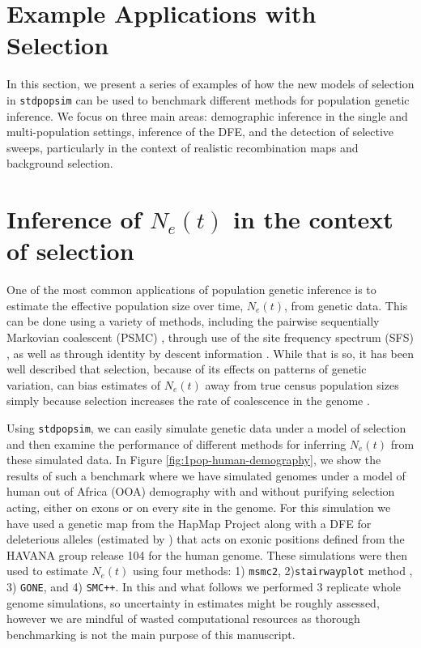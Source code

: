 \documentclass[hidelinks]{article}
\newcommand{\stdpopsim}{\texttt{stdpopsim}\xspace}
\newcommand{\msmc}{\texttt{msmc2}\xspace}
\newcommand{\stairway}{\texttt{stairwayplot}\xspace}
\newcommand{\gone}{\texttt{GONE}\xspace}
\newcommand{\smcpp}{\texttt{SMC++}\xspace}
\begin{document}
    
\section*{Example Applications with Selection}
    \label{applications}
    In this section, we present a series of examples of how the new models of selection
    in \stdpopsim can be used to benchmark different
    methods for population genetic inference.
    We focus on three main areas: demographic inference in the 
    single and multi-population settings, inference of the DFE,
    and the detection of selective sweeps, particularly in the context of realistic recombination maps and background selection.

    \section*{Inference of $N_e(t)$ in the context of selection}
    One of the most common applications of population genetic inference is to estimate
    the effective population size over time, $N_e(t)$, from genetic data. This can be done
    using a variety of methods, including the pairwise sequentially Markovian coalescent
    (PSMC) \citep{li2011inference}, through use of the site frequency spectrum (SFS) \citep{liu2020stairway},
    as well as through identity by descent information \citep{santiago2020recent}. 
    While that is so, it has been well described that selection, because of its effects on
    patterns of genetic variation, can bias estimates of $N_e(t)$
    away from true census population sizes simply because selection increases the 
    rate of coalescence in the genome \citep[e.g.][]{schrider2016effects}. 

    Using \stdpopsim, we can easily simulate genetic data under a model of selection and then 
    examine the performance of different methods for inferring $N_e(t)$ from these simulated 
    data. In Figure \ref{fig:1pop-human-demography}, we show the results of such a benchmark
    where we have simulated genomes under a model of human out of Africa (OOA) demography
    with and without purifying selection acting, either on exons or on every site in the genome.
    For this simulation we have used
    a genetic map from the HapMap Project \citep{international2007second} along with a
    DFE for deleterious alleles (estimated by \cite{huber2017determining})
    that acts on exonic positions defined from the HAVANA group release 104 for the human genome.
    These simulations were then used to estimate $N_e(t)$ using four methods: 1) \msmc \citep{Schiffels2020}, 
    2)\stairway method \citep{liu2020stairway}, 3) \gone \citep{santiago2020recent}, and 4) \smcpp \citep{terhorst2017robust}.
    In this and what follows we performed 3 replicate whole genome simulations, so uncertainty in estimates might
    be roughly assessed, however we are mindful of wasted computational resources as thorough benchmarking
    is not the main purpose of this manuscript.
    
\end{document}
